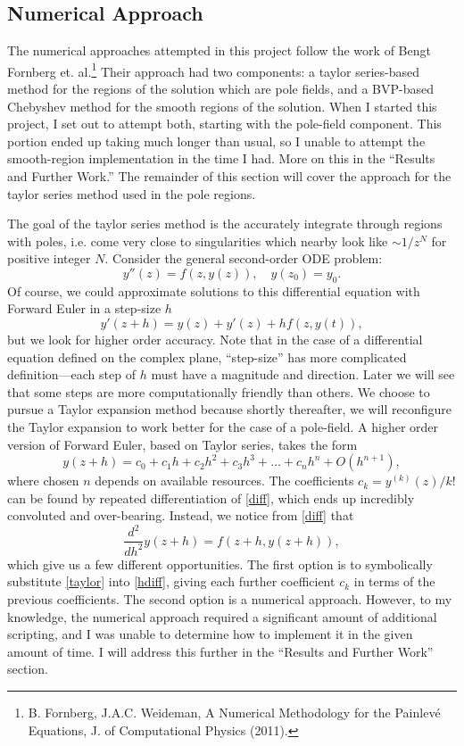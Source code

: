 \documentclass[12pt]{article}
\begin{document}
\subsection{Numerical Approach}

The numerical approaches attempted in this project follow the work of Bengt Fornberg et. al.\footnote{B. Fornberg, J.A.C. Weideman, A Numerical Methodology for the Painlev\'{e} Equations, J. of Computational Physics (2011). } Their approach had two components: a taylor series-based method for the regions of the solution which are pole fields, and a BVP-based Chebyshev method for the smooth regions of the solution. When I started this project, I set out to attempt both, starting with the pole-field component. This portion ended up taking much longer than usual, so I unable to attempt the smooth-region implementation in the time I had. More on this in the ``Results and Further Work.'' The remainder of this section will cover the approach for the taylor series method used in the pole regions. 

The goal of the taylor series method is the accurately integrate through regions with poles, i.e. come very close to singularities which nearby look like $ \sim 1/z^N$ for positive integer $N$. Consider the general second-order ODE problem: 
\begin{equation}
 y''(z) = f(z,y(z)), \quad y(z_0) = y_0.
\end{equation}
Of course, we could approximate solutions to this differential equation with Forward Euler in a step-size $h$
$$ y'(z + h) = y(z) + y'(z) + h f(z,y(t)),$$ 
but we look for higher order accuracy. Note that in the case of a differential equation defined on the complex plane, ``step-size'' has more complicated definition---each step of $h$ must have a magnitude and direction. Later we will see that some steps are more computationally friendly than others. We choose to pursue a Taylor expansion method because shortly thereafter, we will reconfigure the Taylor expansion to work better for the case of a pole-field. A higher order version of Forward Euler, based on Taylor series, takes the form
\begin{equation} \label{taylor}
 y(z + h) = c_0 + c_1 h + c_2 h^2 + c_3 h^3 + \dots + c_n h^n + O(h^{n+1}),
\end{equation}
where chosen $n$ depends on available resources. The coefficients $c_k = y^{(k)}(z)/k!$ can be found by repeated differentiation of \eqref{diff}, which ends up incredibly convoluted and over-bearing. Instead, we notice from \eqref{diff} that
\begin{equation} \label{hdiff}
  \frac{d^2}{dh^2} y(z + h) = f(z + h, y(z + h)),
\end{equation}
which give us a few different opportunities. The first option is to symbolically substitute \eqref{taylor} into \eqref{hdiff}, giving each further coefficient $c_k$ in terms of the previous coefficients. The second option is a numerical approach. However, to my knowledge, the numerical approach required a significant amount of additional scripting, and I was unable to determine how to implement it in the given amount of time. I will address this further in the ``Results and Further Work'' section. 
\end{document}
